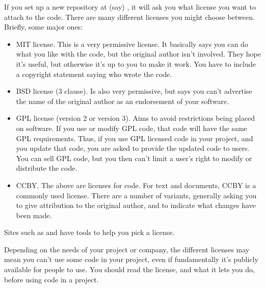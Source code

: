 \documentclass[letterpaper,10pt,british]{sphinxmanual}
\begin{document}
\sphinxAtStartPar
If you set up a new repository at (say) , it will ask you what license you want to attach to the code. There are many different licenses you might choose between. Briefly, some major ones:
\begin{itemize}
\item {} 
\sphinxAtStartPar
MIT license. This is a very permissive license. It basically says you can do what you like with the code, but the original author isn’t involved. They hope it’s useful, but otherwise it’s up to you to make it work. You have to include a copyright statement saying who wrote the code.

\item {} 
\sphinxAtStartPar
BSD license (3 clause). Is also very permissive, but says you can’t advertise the name of the original author as an endorsement of your software.

\item {} 
\sphinxAtStartPar
GPL license (version 2 or version 3). Aims to avoid restrictions being placed on software. If you use or modify GPL code, that code will have the same GPL requirements. Thus, if you use GPL licensed code in your project, and you update that code, you are asked to provide the updated code to users. You can sell GPL code, but you then can’t limit a user’s right to modify or distribute the code.

\item {} 
\sphinxAtStartPar
CC\sphinxhyphen{}BY. The above are licenses for code. For text and documents, CC\sphinxhyphen{}BY is a commonly used license. There are a number of variants, generally asking you to give attribution to the original author, and to indicate what changes have been made.

\end{itemize}

\sphinxAtStartPar
Sites such as  and  have tools to help you pick a license.

\sphinxAtStartPar
Depending on the needs of your project or company, the different licenses may mean you can’t use some code in your project, even if fundamentally it’s publicly available for people to use. You should read the license, and what it lets you do, before using code in a project.
\end{document}
